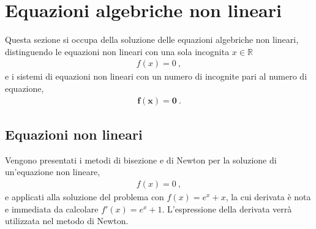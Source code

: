 \documentclass[letterpaper,10pt,italian]{jupyterBook}
\begin{document}
\chapter{Equazioni algebriche non lineari}
\label{\detokenize{ch/numerics/nonlinear:equazioni-algebriche-non-lineari}}\label{\detokenize{ch/numerics/nonlinear::doc}}
\sphinxAtStartPar
Questa sezione si occupa della soluzione delle equazioni algebriche non lineari, distinguendo le equazioni non lineari con una sola incognita \(x \in \mathbb{R}\)
\begin{equation*}
\begin{split}f(x) = 0 \ ,\end{split}
\end{equation*}
\sphinxAtStartPar
e i sistemi di equazioni non lineari con un numero di incognite pari al numero di equazione,
\begin{equation*}
\begin{split}\mathbf{f}(\mathbf{x}) = \mathbf{0} \ .\end{split}
\end{equation*}

\section{Equazioni non lineari}
\label{\detokenize{ch/numerics/nonlinear:equazioni-non-lineari}}
\sphinxAtStartPar
Vengono presentati i metodi di bisezione e di Newton per la soluzione di un’equazione non lineare,
\begin{equation*}
\begin{split}f(x) = 0 \ ,\end{split}
\end{equation*}
\sphinxAtStartPar
e applicati alla soluzione del problema con \(f(x) = e^x + x\), la cui derivata è nota e immediata da calcolare \(f'(x) = e^x + 1\). L’espressione della derivata verrà utilizzata nel metodo di Newton.
\end{document}

